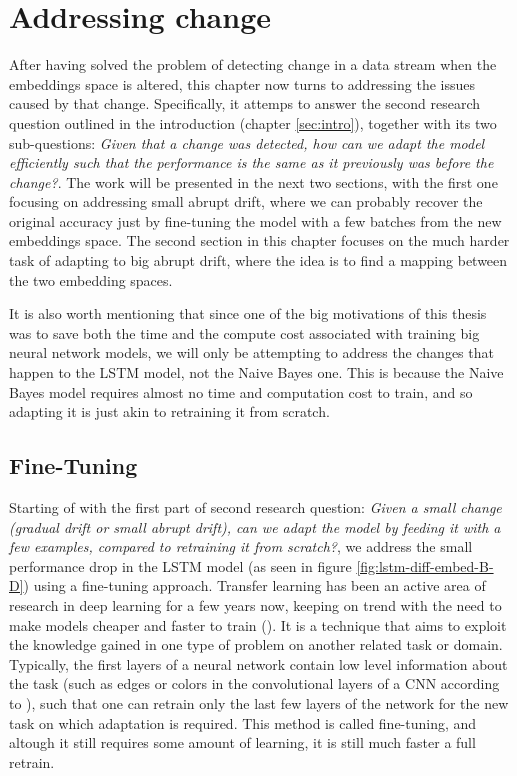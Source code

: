 \documentclass[12pt]{extreport}
\begin{document}
\chapter{Addressing change} \label{sec:addressing}

After having solved the problem of detecting change in a data stream when the embeddings space is altered, this chapter now turns to addressing the issues caused by that change. Specifically, it attemps to answer the second research question outlined in the introduction (chapter \ref{sec:intro}), together with its two sub-questions: \emph{Given that a change was detected, how can we adapt the model efficiently such that the performance is the same as it previously was before the change?}. The work will be presented in the next two sections, with the first one focusing on addressing small abrupt drift, where we can probably recover the original accuracy just by fine-tuning the model with a few batches from the new embeddings space. The second section in this chapter focuses on the much harder task of adapting to big abrupt drift, where the idea is to find a mapping between the two embedding spaces.

It is also worth mentioning that since one of the big motivations of this thesis was to save both the time and the compute cost associated with training big neural network models, we will only be attempting to address the changes that happen to the LSTM model, not the Naive Bayes one. This is because the Naive Bayes model requires almost no time and computation cost to train, and so adapting it is just akin to retraining it from scratch.

\section{Fine-Tuning} \label{sec:fine}

Starting of with the first part of second research question: \emph{Given a small change (gradual drift or small abrupt drift), can we adapt the model by feeding it with a few examples, compared to retraining it from scratch?}, we address the small performance drop in the LSTM model (as seen in figure \ref{fig:lstm-diff-embed-B-D}) using a fine-tuning approach. Transfer learning has been an active area of research in deep learning for a few years now, keeping on trend with the need to make models cheaper and faster to train (\cite{survey-transfer-learning}). It is a technique that aims to exploit the knowledge gained in one type of problem on another related task or domain. Typically, the first layers of a neural network contain low level information about the task (such as edges or colors in the convolutional layers of a CNN according to \cite{survey-transfer-learning}), such that one can retrain only the last few layers of the network for the new task on which adaptation is required. This method is called fine-tuning, and altough it still requires some amount of learning, it is still much faster a full retrain.
\end{document}
